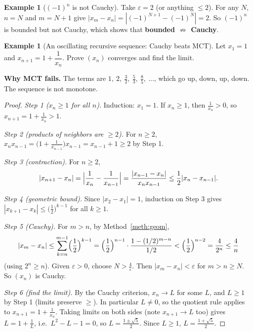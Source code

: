 \documentclass[11pt]{article}
\theoremstyle{definition}
\newtheorem{ex}[defn]{Example}
\newcommand{\eps}{\varepsilon}
\begin{document}
\begin{ex}[$(-1)^n$ is not Cauchy]
Take $\eps=2$ (or anything $\le2$). For any $N$, $n=N$ and $m=N+1$ give
$|x_m-x_n|=|(-1)^{N+1}-(-1)^N|=2$. So $(-1)^n$ is bounded but not
Cauchy, which shows that \textbf{bounded $\not\Rightarrow$ Cauchy}.
\end{ex}

\begin{ex}[An oscillating recursive sequence: Cauchy beats MCT]\label{ex:golden}
Let $x_1=1$ and $x_{n+1}=1+\dfrac1{x_n}$. Prove $(x_n)$ converges and find
the limit.

\smallskip\noindent\textbf{Why MCT fails.} The terms are
$1,\ 2,\ \frac32,\ \frac53,\ \frac85,\ \dots$, which go up, down, up,
down. The sequence is not monotone.

\begin{proof}
\emph{Step 1 ($x_n\ge1$ for all $n$).} Induction: $x_1=1$. If $x_n\ge1$,
then $\frac1{x_n}>0$, so $x_{n+1}=1+\frac1{x_n}>1$.

\emph{Step 2 (products of neighbors are $\ge2$).} For $n\ge2$,
$x_nx_{n-1}=\bigl(1+\frac1{x_{n-1}}\bigr)x_{n-1}=x_{n-1}+1\ge2$ by Step 1.

\emph{Step 3 (contraction).} For $n\ge2$,
\[
|x_{n+1}-x_n|=\Bigl|\frac1{x_n}-\frac1{x_{n-1}}\Bigr|
=\frac{|x_{n-1}-x_n|}{x_nx_{n-1}}\le\frac12|x_n-x_{n-1}|.
\]

\emph{Step 4 (geometric bound).} Since $|x_2-x_1|=1$, induction on Step 3
gives $|x_{k+1}-x_k|\le\bigl(\frac12\bigr)^{k-1}$ for all $k\ge1$.

\emph{Step 5 (Cauchy).} For $m>n$, by Method~\ref{meth:geom},
\[
|x_m-x_n|\le\sum_{k=n}^{m-1}\Bigl(\frac12\Bigr)^{k-1}
=\Bigl(\frac12\Bigr)^{n-1}\cdot\frac{1-(1/2)^{m-n}}{1/2}
<\Bigl(\frac12\Bigr)^{n-2}=\frac4{2^n}\le\frac4n
\]
(using $2^n\ge n$). Given $\eps>0$, choose $N>\frac4\eps$. Then
$|x_m-x_n|<\eps$ for $m>n\ge N$. So $(x_n)$ is Cauchy.

\emph{Step 6 (find the limit).} By the Cauchy criterion, $x_n\to L$ for
some $L$, and $L\ge1$ by Step 1 (limits preserve $\ge$). In particular
$L\ne0$, so the quotient rule applies to $x_{n+1}=1+\frac1{x_n}$. Taking
limits on both sides (note $x_{n+1}\to L$ too) gives $L=1+\frac1L$, i.e.\
$L^2-L-1=0$, so $L=\frac{1\pm\sqrt5}2$. Since $L\ge1$,
$L=\frac{1+\sqrt5}2$.
\end{proof}
\end{ex}
\end{document}
